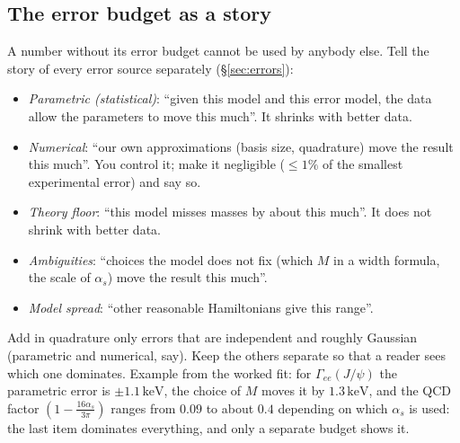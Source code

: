 \documentclass[11pt,a4paper]{article}
\numberwithin{equation}{section}
\theoremstyle{definition}
\theoremstyle{plain}
\theoremstyle{remark}
\numberwithin{algorithm}{section}
\newcommand{\as}{\alpha_s}
\newcommand{\keV}{\,\mathrm{keV}}
\begin{document}
\subsection{The error budget as a story}\label{sec:pr-budget}
A number without its error budget cannot be used by anybody else. Tell the story of every error source separately (\S\ref{sec:errors}):
\begin{itemize}[leftmargin=1.3em,itemsep=3pt]
\item \emph{Parametric (statistical)}: ``given this model and this error model, the data allow the parameters to move this much''. It shrinks with better data.
\item \emph{Numerical}: ``our own approximations (basis size, quadrature) move the result this much''. You control it; make it negligible ($\le1\%$ of the smallest experimental error) and say so.
\item \emph{Theory floor}: ``this model misses masses by about this much''. It does not shrink with better data.
\item \emph{Ambiguities}: ``choices the model does not fix (which $M$ in a width formula, the scale of $\as$) move the result this much''.
\item \emph{Model spread}: ``other reasonable Hamiltonians give this range''.
\end{itemize}
Add in quadrature only errors that are independent and roughly Gaussian (parametric and numerical, say). Keep the others separate so that a reader sees which one dominates. Example from the worked fit: for $\Gamma_{ee}(J/\psi)$ the parametric error is $\pm1.1\keV$, the choice of $M$ moves it by $1.3\keV$, and the QCD factor $(1-\frac{16\as}{3\pi})$ ranges from $0.09$ to about $0.4$ depending on which $\as$ is used: the last item dominates everything, and only a separate budget shows it.

\end{document}
